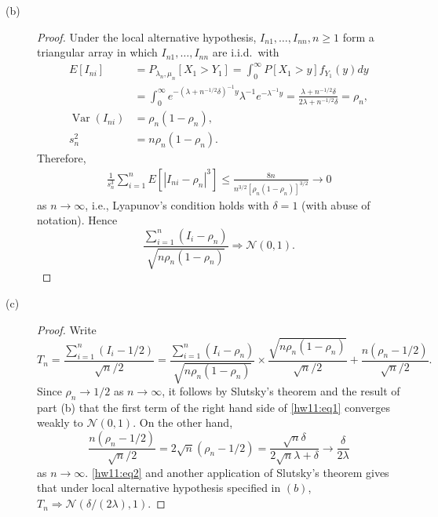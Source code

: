 \documentclass{article}
\newcommand{\gaussian}{\mathcal{N}}
\DeclareMathOperator*{\Var}{Var}
\theoremstyle{definition}
\theoremstyle{plain}
\theoremstyle{remark}
\begin{document}
\begin{description}
\begin{description}
\item[(b)]
\begin{proof}
Under the local alternative hypothesis, $I_{n1}, \ldots, I_{nn}, n \geq 1$ form a triangular 
array in which $I_{n1}, \ldots, I_{nn}$ are i.i.d.\ with 
\begin{align*}
    E[I_{ni}] & = P_{\lambda_n, \mu_n}[X_1 > Y_1] = \int_0^\infty P[X_1 > y]f_{Y_1}(y) dy \\
    & = \int_0^\infty e^{-(\lambda + n^{-1/2}\delta)^{-1}y} \lambda^{-1}e^{-\lambda^{-1}y}
    = \frac{\lambda + n^{-1/2}\delta}{2\lambda + n^{-1/2}\delta} = \rho_n, \\
    \Var(I_{ni}) & = \rho_n(1 - \rho_n), \\
    s_n^2 & = n\rho_n(1 - \rho_n).
\end{align*}
Therefore,
\begin{align*}
    \frac{1}{s_n^3}\sum_{i = 1}^n E[|I_{ni} - \rho_n|^3] \leq \frac{8n}{n^{3/2}[\rho_n(1 - \rho_n)]^{3/2}} \to 0 
\end{align*}
as $n \to \infty$, i.e., Lyapunov's condition holds with $\delta = 1$ (with abuse of 
notation). Hence
$$\frac{\sum_{i = 1}^n (I_i - \rho_n)}{\sqrt{n\rho_n(1 - \rho_n)}} \Rightarrow \gaussian(0, 1).$$
\end{proof}

\item[(c)]
\begin{proof}
Write
\begin{equation}\label{hw11:eq1}
T_n = \frac{\sum_{i = 1}^n (I_i - 1/2)}{\sqrt{n}/2} = \frac{\sum_{i = 1}^n(I_i - \rho_n)}{\sqrt{n\rho_n(1 - \rho_n)}} \times \frac{\sqrt{n\rho_n(1 - \rho_n)}}{\sqrt{n}/2} + \frac{n(\rho_n - 1/2)}{\sqrt{n}/2}.
\end{equation}
Since $\rho_n \to 1/2$ as $n \to \infty$, it follows by Slutsky's theorem and the result of 
part (b) that the first term of the right hand side of \eqref{hw11:eq1} converges weakly to
$\gaussian(0, 1)$. On the other hand,
\begin{equation}\label{hw11:eq2}
\frac{n(\rho_n - 1/2)}{\sqrt{n}/2} = 2\sqrt{n}(\rho_n - 1/2) = \frac{\sqrt{n}\delta}{2\sqrt{n}\lambda + \delta} \to \frac{\delta}{2\lambda}
\end{equation}
as $n \to \infty$. \eqref{hw11:eq2} and another application of Slutsky's theorem gives
that under local alternative hypothesis specified in $(b)$, $T_n \Rightarrow \gaussian(\delta/(2\lambda), 1)$. 
\end{proof}
\end{description}


\end{description}
\end{document}
